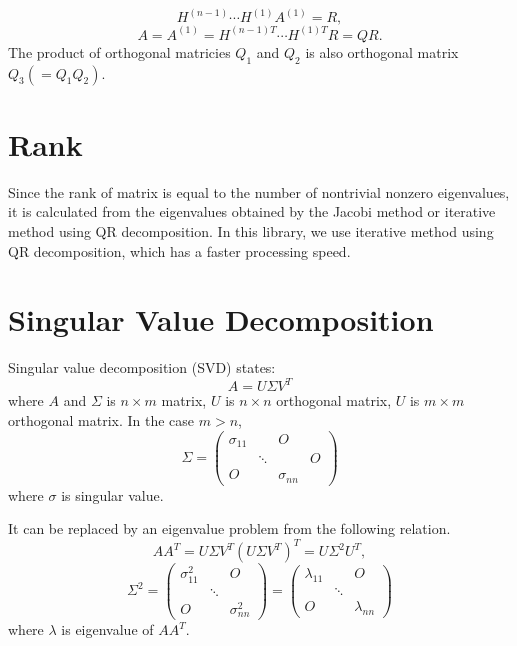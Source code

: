 \documentclass[dvipdfmx]{article}
\begin{document}
$$
H^{(n-1)} {\cdots} H^{(1)} A^{(1)} = R,
$$
$$
A = A^{(1)} = H^{(n-1)T} {\cdots} H^{(1)T} R = QR.
$$
The product of orthogonal matricies $Q_1$ and $Q_2$ is also orthogonal matrix $Q_3(=Q_1Q_2)$.


\section*{Rank}
Since the rank of matrix is equal to the number of nontrivial nonzero eigenvalues, 
it is calculated from the eigenvalues obtained by the Jacobi method or iterative method using QR decomposition.
In this library, we use iterative method using QR decomposition, which has a faster processing speed.

 
\section*{Singular Value Decomposition}
Singular value decomposition (SVD) states:
$$
A = U {\Sigma} V^T
$$
where $A$ and ${\Sigma}$ is ${n{\times}m}$ matrix, $U$ is ${n{\times}n}$ orthogonal matrix, $U$ is ${m{\times}m}$ orthogonal matrix.
In the case $m > n$,
 \[
   {\Sigma} =
   \left(
   \begin{array}{ccc|c}
   {\sigma}_{11} & \            & O                    & \ \\
   \                      & {\ddots} & \                     & O \\
   O                    & \            & {\sigma}_{nn} & \
   \end{array}
   \right) 
  \] 
  where ${\sigma}$ is singular value.

It can be replaced by an eigenvalue problem from the following relation.
$$
AA^T = U {\Sigma} V^T  (U {\Sigma} V^T)^T = U{\Sigma}^2U^T ,
$$
 \[
   {\Sigma}^2 =
   \left(
   \begin{array}{ccc}
   {\sigma}_{11}^2 & \            & O \\
   \                         & {\ddots} & \   \\
   O                       & \            & {\sigma}_{nn}^2
   \end{array}
   \right) =
   \left(
   \begin{array}{ccc}
   {\lambda}_{11} & \            & O \\
   \                       & {\ddots} & \   \\
   O                     & \            & {\lambda}_{nn}
   \end{array}
   \right) 
  \] 
  where $\lambda$ is eigenvalue of $AA^T$.
 
\end{document}
